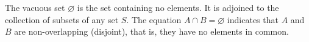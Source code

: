 The vacuous set $\varnothing$ is the set containing no elements. It is adjoined to the collection of subsets of any set $S$. The equation $A \cap B = \varnothing$ indicates that $A$ and $B$ are non-overlapping (disjoint), that is, they have no elements in common.
